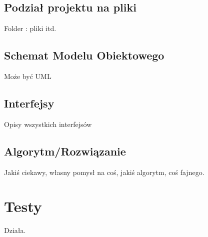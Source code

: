 \documentclass[12pt,a4paper]{article}
\begin{document}
		\subsection{Podział projektu na pliki}
			Folder : pliki itd.
		\subsection{Schemat Modelu Obiektowego}
			Może być UML		
		\subsection{Interfejsy}
			Opisy wszystkich interfejsów
		\subsection{Algorytm/Rozwiązanie}
			Jakiś ciekawy, własny pomysł na coś, jakiś algorytm, coś fajnego.
	\section{Testy}
		Działa. 
\end{document}

